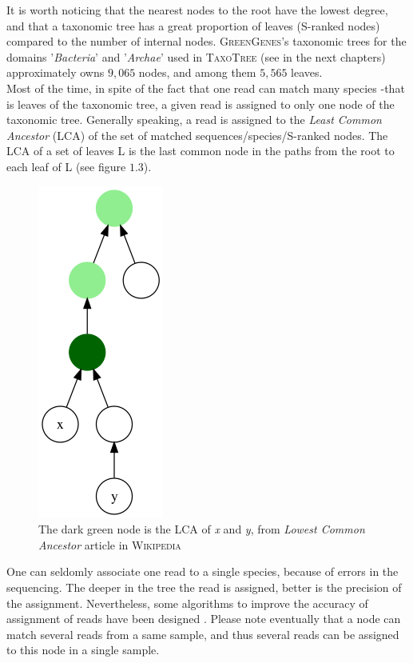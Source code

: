 \documentclass{report}
\begin{document}
It is worth noticing that the nearest nodes to the root have the lowest degree, and that a taxonomic tree has a great proportion of leaves (S-ranked nodes) compared to the number of internal nodes. \textsc{GreenGenes}'s taxonomic trees for the domains '\emph{Bacteria}' and '\emph{Archae}' used in \textsc{TaxoTree} (see in the next chapters) approximately owns $9,065$ nodes, and among them $5,565$ leaves.\\

Most of the time, in spite of the fact that one read can match many species -that is leaves of the taxonomic tree, a given read is assigned to only one node of the taxonomic tree. Generally speaking, a read is assigned to the \emph{Least Common Ancestor} (LCA) \cite{Tarjan} of the set of matched sequences/species/S-ranked nodes. The LCA of a set of leaves L is the last common node in the paths from the root to each leaf of L (see figure $1.3$).

\begin{figure}[H]
\centering
\includegraphics[scale=0.35]{illustrations/Lowest_common_ancestor.png}
\caption{The dark green node is the LCA of \emph{x} and \emph{y}, from \emph{Lowest Common Ancestor} article in \textsc{Wikipedia}}
\end{figure}

One can seldomly associate one read to a single species, because of errors in the sequencing. The deeper in the tree the read is assigned, better is the precision of the assignment. Nevertheless, some algorithms to improve the accuracy of assignment of reads have been designed \cite{Tango1} \cite{Tango3}. Please note eventually that a node can match several reads from a same sample, and thus several reads can be assigned to this node in a single sample.
\end{document}
